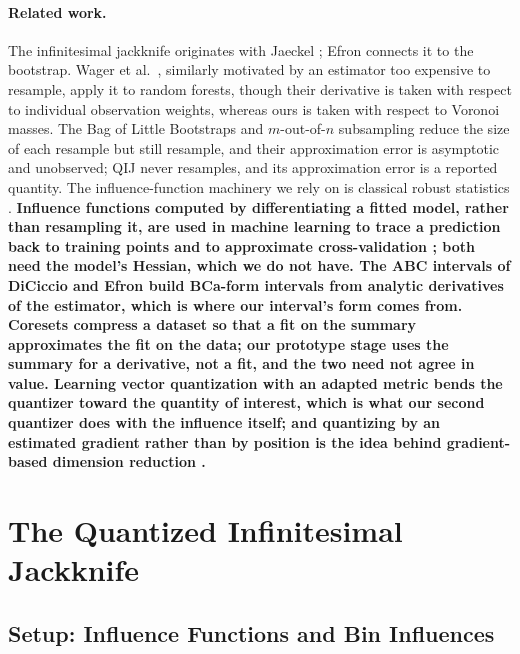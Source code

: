 \documentclass[runningheads]{llncs}
\newif\ifrev \revtrue
\newcommand{\rev}[1]{\ifrev{\color{blue}\bfseries #1}\else#1\fi}
\begin{document}
\paragraph{Related work.} The infinitesimal jackknife originates with Jaeckel \cite{jaeckel1972}; Efron \cite{efron1982} connects it to the bootstrap. Wager et al.\ \cite{wager2014}, similarly motivated by an estimator too expensive to resample, apply it to random forests, though their derivative is taken with respect to individual observation weights, whereas ours is taken with respect to Voronoi masses. The Bag of Little Bootstraps \cite{kleiner2014} and $m$-out-of-$n$ subsampling \cite{bickel1997} reduce the size of each resample but still resample, and their approximation error is asymptotic and unobserved; QIJ never resamples, and its approximation error is a reported quantity. The influence-function machinery we rely on is classical robust statistics \cite{hampel1974,stefanski2002}. \rev{Influence functions computed by differentiating a fitted model, rather than resampling it, are used in machine learning to trace a prediction back to training points \cite{koh2017} and to approximate cross-validation \cite{giordano2019}; both need the model's Hessian, which we do not have. The ABC intervals of DiCiccio and Efron \cite{diciccio1996} build BCa-form intervals from analytic derivatives of the estimator, which is where our interval's form comes from. Coresets \cite{feldman2011} compress a dataset so that a fit on the summary approximates the fit on the data; our prototype stage uses the summary for a derivative, not a fit, and the two need not agree in value. Learning vector quantization with an adapted metric \cite{hammer2002,schneider2009} bends the quantizer toward the quantity of interest, which is what our second quantizer does with the influence itself; and quantizing by an estimated gradient rather than by position is the idea behind gradient-based dimension reduction \cite{xia2002}.}

\section{The Quantized Infinitesimal Jackknife}\label{sec:method}

\subsection{Setup: Influence Functions and Bin Influences}\label{sec:setup}
\end{document}
